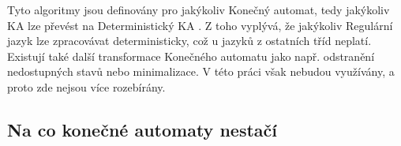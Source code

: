 \vspace{0.5cm}

Tyto algoritmy jsou definovány pro jakýkoliv Konečný automat, tedy jakýkoliv KA
lze převést na Deterministický KA \cite[str. 39]{MedunaIFJ}.
Z toho vyplývá, že jakýkoliv Regulární jazyk lze zpracovávat deterministicky,
což u jazyků z ostatních tříd  neplatí.\\

Existují také další transformace Konečného automatu jako např.
odstranění nedostupných stavů nebo minimalizace. V této práci však
nebudou využívány, a proto zde nejsou více rozebírány.\\

\subsection*{Na co konečné automaty nestačí}

